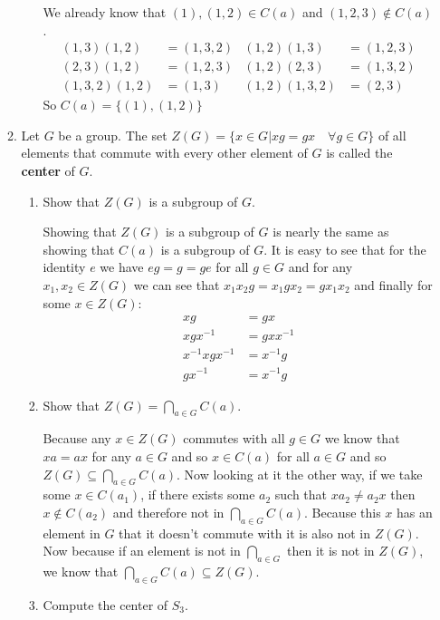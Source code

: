 \documentclass[letterpaper]{article}
\begin{document}
\begin{enumerate}
\begin{enumerate}
\begin{enumerate}
      We already know that $(1),(1,2)\in C(a)$ and $(1,2,3)\not\in C(a)$.
      \begin{align*}
        (1,3)(1,2)&=(1,3,2)&(1,2)(1,3)&=(1,2,3)\\
        (2,3)(1,2)&=(1,2,3)&(1,2)(2,3)&=(1,3,2)\\
        (1,3,2)(1,2)&=(1,3)&(1,2)(1,3,2)&=(2,3)
      \end{align*}
      So $C(a)=\{(1),(1,2)\}$
    \end{enumerate}
  \setcounter{enumii}{20}
  \item
    Let $G$ be a group. The set $Z(G)=\{x\in G|xg=gx \quad \forall g\in G \}$ of all elements that commute with every other element of $G$ is called the {\bfseries center} of $G$.
    \begin{enumerate}
    \item
      Show that $Z(G)$ is a subgroup of $G$.

      Showing that $Z(G)$ is a subgroup of $G$ is nearly the same as showing that $C(a)$ is a subgroup of $G$. It is easy to see that for the identity $e$ we have $eg=g=ge$ for all $g\in G$ and for any $x_1,x_2\in Z(G)$ we can see that $x_1x_2g=x_1gx_2=gx_1x_2$ and finally for some $x\in Z(G)$:
      \begin{align*}
        xg&=gx\\
        xgx^{-1}&=gxx^{-1}\\
        x^{-1}xgx^{-1}&=x^{-1}g\\
        gx^{-1}&=x^{-1}g
      \end{align*}
    \item
      Show that $Z(G)=\bigcap_{a\in G}{C(a)}$.

      Because any $x\in Z(G)$ commutes with all $g\in G$ we know that $xa=ax$ for any $a\in G$ and so $x\in C(a)$ for all $a\in G$ and so $Z(G)\subseteq \bigcap_{a\in G}C(a)$. Now looking at it the other way, if we take some $x\in C(a_1)$, if there exists some $a_2$ such that $xa_2\ne a_2x$ then $x\not\in C(a_2)$ and therefore not in $\bigcap_{a\in G}C(a)$. Because this $x$ has an element in $G$ that it doesn't commute with it is also not in $Z(G)$. Now because if an element is not in $\bigcap_{a\in G}$ then it is not in $Z(G)$, we know that $\bigcap_{a\in G}C(a)\subseteq Z(G)$.
    \item
      Compute the center of $S_3$.


\end{enumerate}
\end{enumerate}
\end{enumerate}
\end{document}
